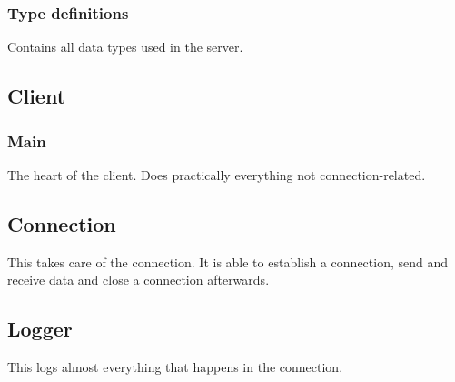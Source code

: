 \documentclass[a4paper]{article}
\begin{document}


\subsubsection{Type definitions}
Contains all data types used in the server.


\subsection{Client}
\subsubsection{Main}
The heart of the client. Does practically everything not connection-related.




\subsection{Connection}
This takes care of the connection. It is able to establish a connection, send
and receive data and close a connection afterwards.




\subsection{Logger}
This logs almost everything that happens in the connection.



\end{document}
